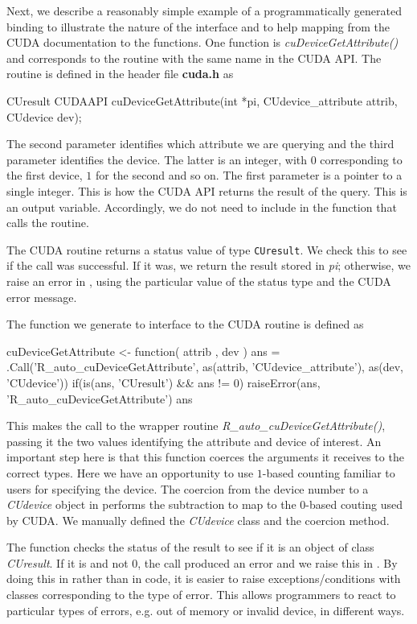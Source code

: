 \documentclass[article]{jss}
\def\C{\proglang{C}}
\def\R{\proglang{R}}
\def\Rfunc#1{\textsl{#1()}}
\def\Cfunc#1{\textit{#1()}}
\def\Cvar#1{\textit{#1}}
\def\file#1{\textbf{#1}}
\def\Ctype#1{\texttt{#1}}
\def\Rclass#1{\textit{#1}}
\begin{document}
Next, we describe a reasonably simple example of a programmatically
generated binding to illustrate the nature of the interface and to
help mapping  from the CUDA documentation to the \R{} functions.
One function is \Rfunc{cuDeviceGetAttribute} and corresponds to the routine
with the same name in the CUDA API.
The routine is defined  in the header file \file{cuda.h} as
\begin{Code}
CUresult CUDAAPI 
cuDeviceGetAttribute(int *pi, CUdevice_attribute attrib, CUdevice dev);
\end{Code}
The second parameter identifies which attribute we are querying and
the third parameter identifies the device. The latter is an integer,
with $0$ corresponding to the first device, $1$ for the second and so
on.  The first parameter is a pointer to a single integer. This is how
the CUDA API returns the result of the query.  This is an output
variable. Accordingly, we do not need to include in the \R{} function
that calls the \C{} routine.

The CUDA routine returns a status value of type \Ctype{CUresult}.  We
check this to see if the call was successful. If it was, we return the
result stored in \Cvar{pi}; otherwise, we raise an error in \R, using
the particular value of the status type and the CUDA error message.

The \R{} function we generate to interface to the CUDA routine is
defined as
\begin{RCode}
cuDeviceGetAttribute <-
function( attrib , dev  )
{
   ans = .Call('R_auto_cuDeviceGetAttribute', 
                   as(attrib, 'CUdevice_attribute'), 
                   as(dev, 'CUdevice'))
   if(is(ans, 'CUresult') && ans != 0)
       raiseError(ans, 'R_auto_cuDeviceGetAttribute')
   ans
}
\end{RCode}
This makes the call to the wrapper routine
\Cfunc{R\_auto\_cuDeviceGetAttribute}, passing it the two \R{} values
identifying the attribute and device of interest.  An important step
here is that this \R{} function coerces the arguments it receives to
the correct types.  Here we have an opportunity to use $1$-based
counting familiar to \R{} users for specifying the device.  The
coercion from the device number to a \Rclass{CUdevice} object in \R{}
performs the subtraction to map to the $0$-based couting used by CUDA.
We manually defined the \Rclass{CUdevice} class and the coercion method.

The function checks the status of the result to see if it is an \R{}
object of class \Rclass{CUresult}. If it is and not $0$, the call
produced an error and we raise this in \R. By doing this in \R{}
rather than in \C{} code, it is easier to raise exceptions/conditions
with classes corresponding to the type of error. This allows
programmers to react to particular types of errors, e.g. out of memory
or invalid device, in different ways.
\end{document}
